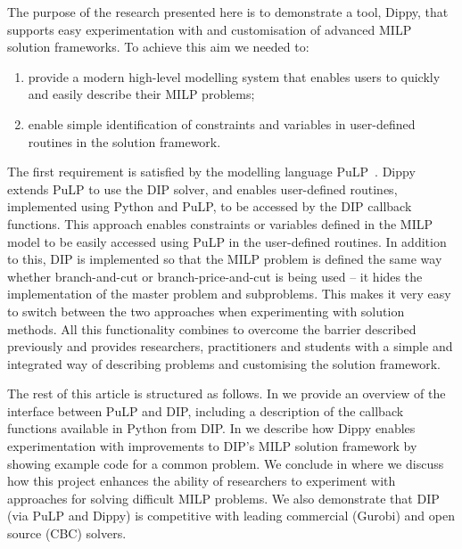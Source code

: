 The purpose of the research presented here is to demonstrate a tool, Dippy, that supports easy experimentation with and customisation of advanced \ac{MILP} solution frameworks. 
To achieve this aim we needed to:
\begin{enumerate}
\item provide a modern high-level modelling system that enables users to quickly and easily describe their \ac{MILP} problems;
\item enable simple identification of constraints and variables in user-defined routines in the solution framework.
\end{enumerate}
The first requirement is satisfied by the modelling language PuLP~\cite{pulp}.
Dippy extends PuLP to use the \ac{DIP} solver, and enables user-defined routines, implemented using Python and PuLP, to be accessed by the \ac{DIP} callback functions. This approach enables constraints or variables defined in the \ac{MILP} model to be easily accessed using PuLP in the user-defined routines.
In addition to this, \ac{DIP} is implemented so that the \ac{MILP} problem is defined the same way whether branch-and-cut or branch-price-and-cut is being used -- it hides the implementation of the master problem and subproblems.
This makes it very easy to switch between the two approaches when experimenting with solution methods.
All this functionality combines to overcome the barrier described previously and provides researchers, practitioners and students with a simple and integrated way of describing problems and customising the solution framework.

The rest of this article is structured as follows.
In  we provide an overview of the interface between PuLP and \ac{DIP}, including a description of the callback functions available in Python from \ac{DIP}.
In  we describe how Dippy enables experimentation with improvements to \ac{DIP}'s \ac{MILP} solution framework by showing example code for a common problem.
We conclude in  where we discuss how this project enhances the ability of researchers to experiment with approaches for solving difficult \ac{MILP} problems. We also demonstrate that \ac{DIP} (via PuLP and Dippy) is competitive with leading commercial (Gurobi) and open source (CBC) solvers.
